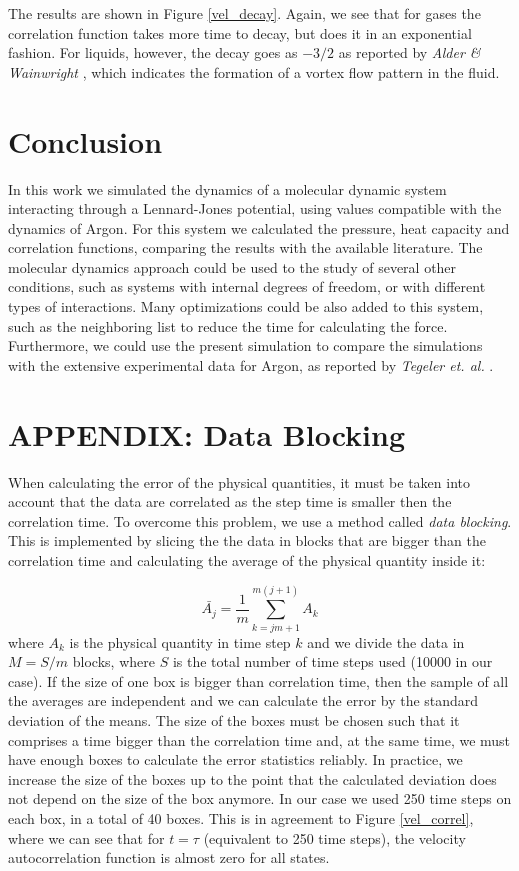\documentclass[aps,prl,reprint,groupedaddress]{revtex4-1}
\begin{document}
The results are shown in Figure \ref{vel_decay}. Again, we see that for gases the correlation function takes more time to decay, but does it in an exponential fashion. For liquids, however, the decay goes as $-3/2$ as reported by \textit{Alder \& Wainwright} \cite{Alder1970}, which indicates the formation of a vortex flow pattern in the fluid.

\section{Conclusion \label{conclusion}}

In this work we simulated the dynamics of a molecular dynamic system interacting through a Lennard-Jones potential, using values compatible with the dynamics of Argon. For this system we calculated the pressure, heat capacity and correlation functions, comparing the results with the available literature. The molecular dynamics approach could be used to the study of several other conditions, such as systems with internal degrees of freedom, or with different types of interactions. Many optimizations could be also added to this system, such as the neighboring list to reduce the time for calculating the force. Furthermore, we could use the present simulation to compare the simulations with the extensive experimental data for Argon, as reported by \textit{Tegeler et. al.} \cite{Tegeler1999}.

\appendix
\section{APPENDIX: Data Blocking}

When calculating the error of the physical quantities, it must be taken into account that the data are correlated as the step time is smaller then the correlation time. To overcome this problem, we use a method called \textit{data blocking}. This is implemented by slicing the the data in blocks that are bigger than the correlation time and calculating the average of the physical quantity inside it:

\begin{equation}
	\bar{A_j} = \frac{1}{m} \sum_{k=jm+1}^{m(j+1)} A_k
\end{equation}
where $A_k$ is the physical quantity in time step $k$ and we divide the data in $M = S/m$ blocks, where $S$ is the total number of time steps used (10000 in our case). If the size of one box is bigger than correlation time, then the sample of all the averages are independent and we can calculate the error by the standard deviation of the means. The size of the boxes must be chosen such that it comprises a time bigger than the correlation time and, at the same time, we must have enough boxes to calculate the error statistics reliably. In practice, we increase the size of the boxes up to the point that the calculated deviation does not depend on the size of the box anymore. In our case we used 250 time steps on each box, in a total of 40 boxes. This is in agreement to Figure \ref{vel_correl}, where we can see that for $t = \tau$ (equivalent to 250 time steps), the velocity autocorrelation function is almost zero for all states. 


\end{document}
